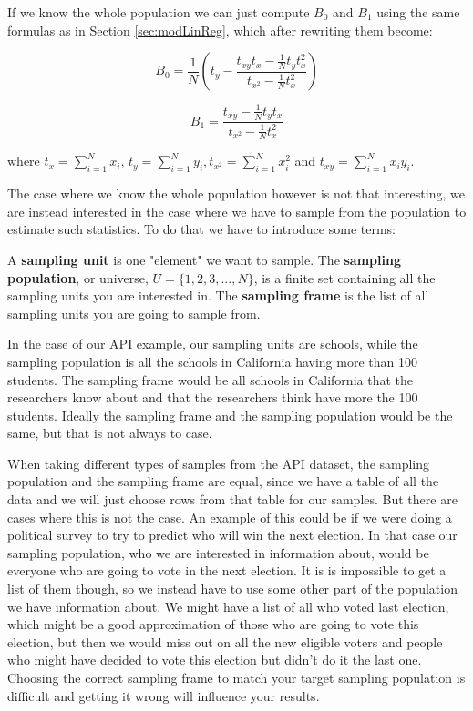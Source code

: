 \documentclass{article}
\begin{document}
If we know the whole population we can just compute \(B_0\) and \(B_1\) using the same formulas
as in Section \ref{sec:modLinReg}, which after rewriting them become:

\begin{equation*}
  B_0 = \frac{1}{N} \left( t_y - \frac{t_{xy} t_x - \frac{1}{N} t_y t_x^2}
    {t_{x^2} - \frac{1}{N} t_x^2}
   \right)
\end{equation*}

\begin{equation*}
  B_1 = \frac{t_{xy} - \frac{1}{N} t_y t_x}
    {t_{x^2} - \frac{1}{N} t_x^2}
\end{equation*}

where \(t_x = \sum_{i = 1}^N x_i\), \(t_y = \sum_{i = 1}^N y_i, t_{x^2} =
\sum_{i = 1}^N x_i^2\) and \(t_{xy} =
\sum_{i = 1}^N x_i y_i\).


The case where we know the whole population however is not that interesting, we are instead interested in the case where we have to sample from the
population to estimate such statistics. To do that we have to introduce some terms:

\begin{definition} \label{def:sampUnitPopFrame}
  A \textbf{sampling unit} is one "element" we want to sample.
  The \textbf{sampling population}, or universe, \(U = \{1, 2, 3, ..., N\}\), is a
  finite set containing all the sampling units you are interested in. 
  The \textbf{sampling frame} is the list of all sampling units you are going to sample from. 
\end{definition}

In the case of our API example, our sampling units are schools, while
the sampling population is all the schools in California having more than 100 students.
The sampling frame would be all schools in California that the researchers know
about and that the researchers think have more the 100 students.
Ideally the sampling frame and the sampling population would be the same, but that is not always to case.

When taking different types of samples from the API dataset, the sampling population and the sampling frame are equal, since
we have a table of all the data and we will just choose rows from that table for
our samples. But there are cases where this is not the case. An example of this
could be if we were doing a political survey to try to predict who will win the
next election.
In that case our sampling population, who we are interested in information
about, would be everyone who are going to vote in the next election. It is
is impossible to get a list of them though, so we instead have to use 
some other part of the population we have information about. We might have a
list of all who voted last election, which might be a good approximation of
those who are going to vote this election, but then we would miss out on all the
new eligible voters and people who might have decided to vote this election but
didn't do it the last one.
Choosing the correct sampling frame to match your target sampling population is
difficult and getting it wrong will influence your results.
\end{document}
